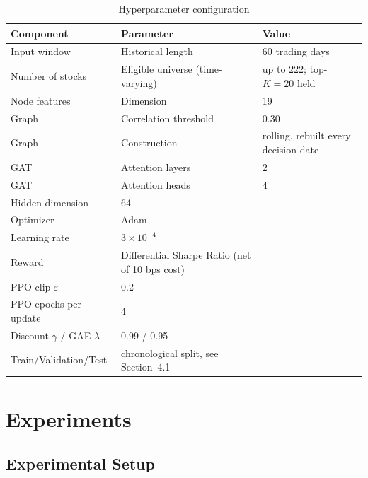 \documentclass[runningheads]{llncs}
\begin{document}
\begin{table}[ht]
\centering
\caption{Hyperparameter configuration}
\label{tab:hyperparameters}
\begin{tabular}{lll}
\toprule
Component & Parameter & Value\\
\midrule
Input window & Historical length & 60 trading days\\
Number of stocks & Eligible universe (time-varying) & up to 222; top-$K=20$ held\\
Node features & Dimension & 19\\
Graph & Correlation threshold & 0.30\\
Graph & Construction & rolling, rebuilt every decision date\\
GAT & Attention layers & 2\\
GAT & Attention heads & 4\\
Hidden dimension & 64\\
Optimizer & Adam\\
Learning rate & $3\times10^{-4}$\\
Reward & Differential Sharpe Ratio (net of 10 bps cost)\\
PPO clip $\varepsilon$ & 0.2\\
PPO epochs per update & 4\\
Discount $\gamma$ / GAE $\lambda$ & 0.99 / 0.95\\
Train/Validation/Test & chronological split, see Section~4.1\\
\bottomrule
\end{tabular}
\end{table}



\section{Experiments}

\subsection{Experimental Setup}
\end{document}
